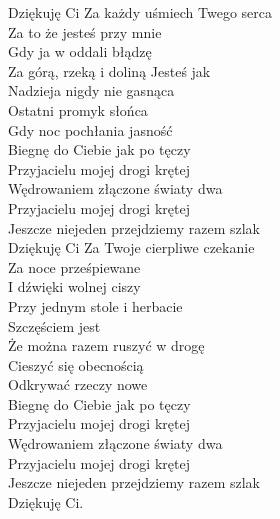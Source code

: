 \begin{text}
    Dziękuję Ci Za każdy uśmiech Twego serca\\
    Za to że jesteś przy mnie\\
    Gdy ja w oddali błądzę\\
    Za górą, rzeką i doliną Jesteś jak\\
    Nadzieja nigdy nie gasnąca\\
    Ostatni promyk słońca\\
    Gdy noc pochłania jasność\\
    Biegnę do Ciebie jak po tęczy\\
    Przyjacielu mojej drogi krętej\\
    Wędrowaniem złączone światy dwa\\
    Przyjacielu mojej drogi krętej\\
    Jeszcze niejeden przejdziemy razem szlak\\
    Dziękuję Ci Za Twoje cierpliwe czekanie\\
    Za noce prześpiewane\\
    I dźwięki wolnej ciszy\\
    Przy jednym stole i herbacie\\
    Szczęściem jest\\
    Że można razem ruszyć w drogę\\
    Cieszyć się obecnością\\
    Odkrywać rzeczy nowe\\
    Biegnę do Ciebie jak po tęczy\\
    Przyjacielu mojej drogi krętej\\
    Wędrowaniem złączone światy dwa\\
    Przyjacielu mojej drogi krętej\\
    Jeszcze niejeden przejdziemy razem szlak\\
    Dziękuję Ci.
\end{text}